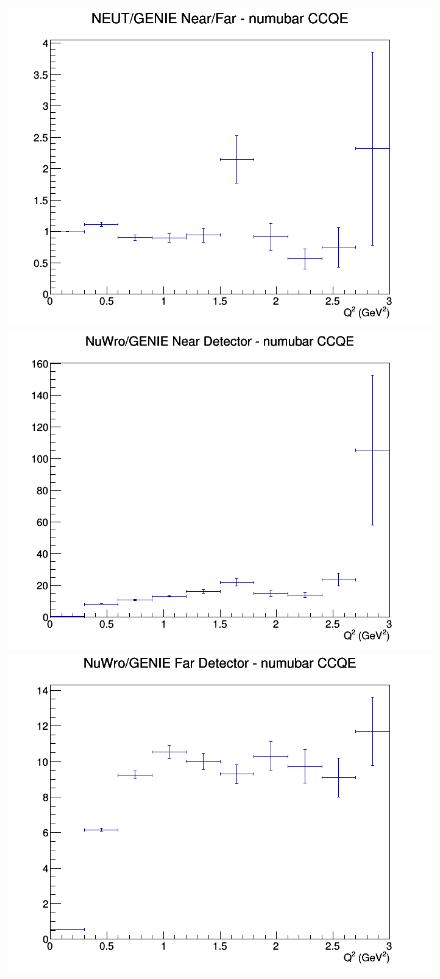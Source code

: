 \begin{figure}[h]
\endminipage
{}
\includegraphics[width=\linewidth]{eff_Q2/FGT/ratios/CCQE_NEUT_GENIE_numubar_NF_Q2.png}
\endminipage
\newline
{}
\includegraphics[width=\linewidth]{eff_Q2/FGT/ratios/CCQE_NuWro_GENIE_numubar_near_Q2.png}
\endminipage
{}
\includegraphics[width=\linewidth]{eff_Q2/FGT/ratios/CCQE_NuWro_GENIE_numubar_far_Q2.png}

\end{figure}
